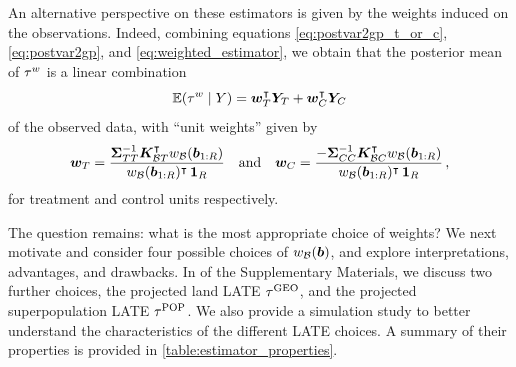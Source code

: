An alternative perspective on these estimators is given by the weights induced on the observations.
Indeed, combining equations \autoref{eq:postvar2gp_t_or_c}, \autoref{eq:postvar2gp}, and \autoref{eq:weighted_estimator}, we obtain that the posterior mean of \(\tau^{w}\) is a linear combination
\begin{equation}
    \E\del{\tauw \mid Y} = \wt\trans \yt + \wc\trans \yc
    \label{eq:unit_weights}
\end{equation}
of the observed data, with ``unit weights'' given by
\begin{equation}
        \bm{w}_{T} = \frac{
            \bm{\Sigma}_{T T}^{-1} 
            \bm{K}_{\mathcal{B} T}^{\intercal} w_{\mathcal{B}}(\bm{b}_{1:R})
        }{
            w_{\mathcal{B}}(\bm{b}_{1:R})^{\intercal} \operatorname{\mathbf{1}}_{R}
        }
        \quad\text{and}\quad
        \bm{w}_{C} = \frac{
            -
            \bm{\Sigma}_{C C}^{-1} 
            \bm{K}_{\mathcal{B} C}^{\intercal} w_{\mathcal{B}}(\bm{b}_{1:R})
        }{
            w_{\mathcal{B}}(\bm{b}_{1:R})^{\intercal} \operatorname{\mathbf{1}}_{R}
        }
        \,,
    \label{eq:unit_weights_gp}
\end{equation}
for treatment and control units respectively.

The question remains: what is the most appropriate choice of weights?
We next motivate and consider four possible choices of \(w_{\mathcal{B}}(\bm{b})\), and explore interpretations, advantages, and drawbacks. 
In  of the Supplementary Materials, we discuss two further choices, the projected land LATE \(\tau^{\mathrm{GEO}}\), and the projected superpopulation LATE \(\tau^{\mathrm{POP}}\).
We also provide a simulation study to better understand the characteristics of the different LATE choices.
A summary of their properties is provided in \autoref{table:estimator_properties}.

